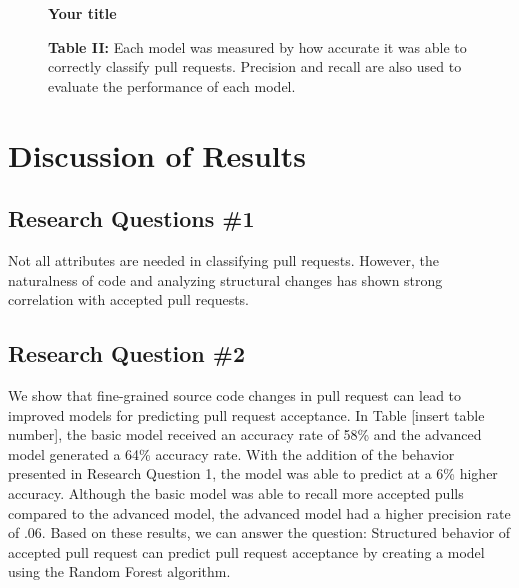 \documentclass[10pt, conference]{IEEEtran}
\begin{document}
\begin{figure}  
\begin{center}
\textbf{Your title}\par\medskip \break
{}
\newline \small \textbf{Table II:} Each model was measured by how accurate it was able to correctly classify pull requests. Precision and recall are also used to evaluate the performance of each model.
\end{center}
\end{figure}


\section{Discussion of Results}
\subsection{Research Questions \#1}
Not all attributes are needed in classifying pull requests. However, the naturalness of code and analyzing structural changes has shown strong correlation with accepted pull requests. 

\subsection{Research Question \#2}
We show that fine-grained source code changes in pull request can lead to improved models for predicting pull request acceptance. In Table [insert table number], the basic model received an accuracy rate of 58\% and the advanced model generated a 64\% accuracy rate. With the addition of the behavior presented in Research Question 1, the model was able to predict at a 6\% higher accuracy. Although the basic model was able to recall more accepted pulls compared to the advanced model, the advanced model had a higher precision rate of .06. Based on these results, we can answer the question: Structured behavior of accepted pull request can predict pull request acceptance by creating a model using the Random Forest algorithm.
\end{document}

